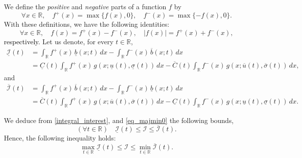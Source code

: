 \documentclass[review]{elsarticle}
\newcommand{\cblue}{\textcolor{black}}
\newcommand{\Ic}{\mathcal{I}}
\newcommand{\bR}{\mathbb{R}}
\newcommand{\emilie}[1]{\textcolor{magenta}{\textbf{[{\em EMILIE SAYS}: #1]}}}
\begin{document}
We define the \emph{positive} and \emph{negative} parts of a function $f$ by
\begin{equation}
\forall x \in \mathbb{R}, \quad f^+(x) = \max\{f(x), 0\}, \quad f^-(x) = \max\{-f(x), 0\}.
\end{equation}
With these definitions, we have the following identities:
\begin{equation}
\forall x \in \mathbb{R}, \quad f(x) = f^+(x) - f^-(x), \quad |f(x)| = f^+(x) + f^-(x),
\end{equation}
\cblue{respectively.}
Let us denote, for every $t \in \mathbb{R}$,
\begin{align}
\underline{\Ic}(t) & = \int_{\mathbb{R}} f^+(x) \, \underline{b}(x;t) \, dx - \int_{\mathbb{R}} f^-(x) \, \overline{b}(x;t) \, dx \nonumber \\
& = \underline{C}(t) \int_{\mathbb{R}}  f^+(x) \, g(x; \underline{u}(t), \underline{\sigma}(t)) \, dx - \overline{C}(t) \int_{\mathbb{R}}  f^-(x) \, g(x; \overline{u}(t), \overline{\sigma}(t)) \, dx,
\end{align}
and
\begin{align}
\overline{\Ic}(t) & = \int_{\mathbb{R}} f^+(x) \, \overline{b}(x;t) \, dx - \int_{\mathbb{R}} f^-(x) \, \underline{b}(x;t) \, dx \nonumber \\
& = \overline{C}(t) \int_{\mathbb{R}} f^+(x) \, g(x; \overline{u}(t), \overline{\sigma}(t)) \, dx - \underline{C}(t) \int_{\mathbb{R}} f^-(x) \, g(x; \underline{u}(t), \underline{\sigma}(t)) \, dx.
\end{align}



We deduce from \eqref{integral_interest}, and \eqref{eq_majmin0} the following bounds,
\begin{equation}
\label{eq:bound_I}
(\forall t \in \bR) \quad \underline{\Ic}(t)\leq \Ic \leq \overline{\Ic}(t).
\end{equation}
Hence, the following inequality holds:
\begin{equation}
\max_{t \in \bR} \underline{\Ic}(t) \leq \Ic \leq \min_{t \in \bR} \overline{\Ic}(t).
\label{eq:bound1}
\end{equation}
\end{document}

